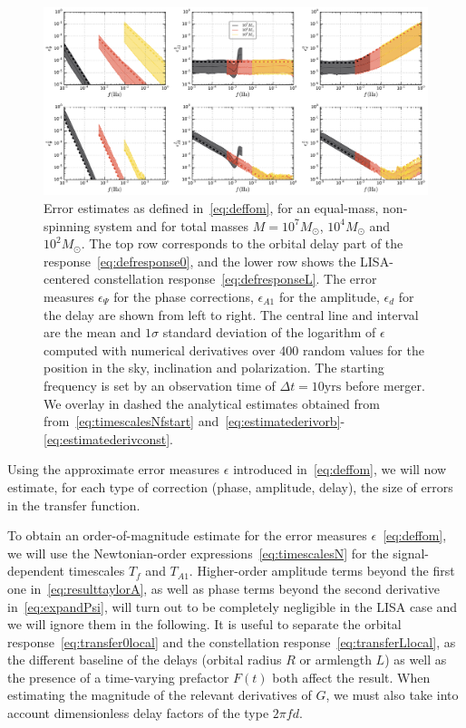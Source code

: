 \documentclass[aps,showpacs,twocolumn,
prd,superscriptaddress,nofootinbib]{revtex4-1}
\newcommand{\Msol}{M_{\odot}}
\newcommand{\Tf}{T_{f}}
\begin{document}
\begin{figure}
  \centering
  \includegraphics[width=.98\linewidth]{plots/lisafom_py.pdf}
  \caption{Error estimates as defined in~\eqref{eq:deffom}, for an equal-mass, non-spinning system and for total masses $M=10^{7} \Msol$, $10^{4} \Msol$ and $10^{2} \Msol$. The top row corresponds to the orbital delay part of the response~\eqref{eq:defresponse0}, and the lower row shows the LISA-centered constellation response~\eqref{eq:defresponseL}. The error measures $\epsilon_{\Psi}$ for the phase corrections, $\epsilon_{A1}$ for the amplitude, $\epsilon_{d}$ for the delay are shown from left to right. The central line and interval are the mean and $1\sigma$ standard deviation of the logarithm of $\epsilon$ computed with numerical derivatives over 400 random values for the position in the sky, inclination and polarization. The starting frequency is set by an observation time of $\Delta t = 10 \text{yrs}$ before merger. We overlay in dashed the analytical estimates obtained from from~\eqref{eq:timescalesNfstart} and~\eqref{eq:estimatederivorb}-\eqref{eq:estimatederivconst}.}
  \label{fig:fomLISA}
\end{figure}

Using the approximate error measures $\epsilon$ introduced in~\eqref{eq:deffom}, we will now estimate, for each type of correction (phase, amplitude, delay), the size of errors in the transfer function.

To obtain an order-of-magnitude estimate for the error measures $\epsilon$~\eqref{eq:deffom}, we will use the Newtonian-order expressions~\eqref{eq:timescalesN} for the signal-dependent timescales $\Tf$ and $T_{A1}$. Higher-order amplitude terms beyond the first one in~\eqref{eq:resulttaylorA}, as well as phase terms beyond the second derivative in~\eqref{eq:expandPsi}, will turn out to be completely negligible in the LISA case and we will ignore them in the following. It is useful to separate the orbital response~\eqref{eq:transfer0local} and the constellation response~\eqref{eq:transferLlocal}, as the different baseline of the delays (orbital radius $R$ or armlength $L$) as well as the presence of a time-varying prefactor $F(t)$ both affect the result. When estimating the magnitude of the relevant derivatives of $G$, we must also take into account dimensionless delay factors of the type $2\pi f d$.
\end{document}
